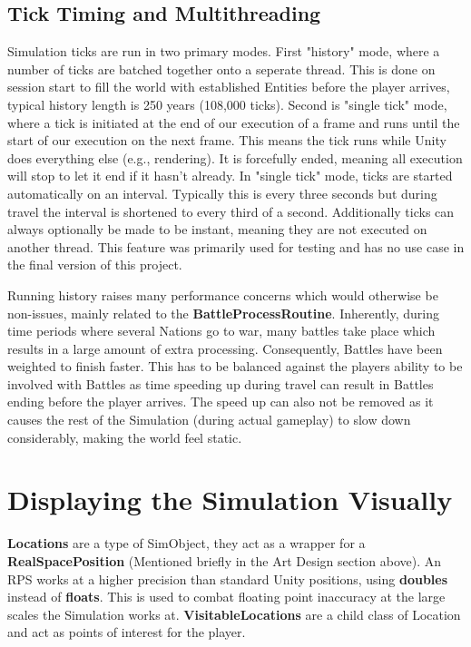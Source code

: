\documentclass{report}
\begin{document}
\subsection{Tick Timing and Multithreading}

Simulation ticks are run in two primary modes. First "history" mode, where a number of ticks are batched together onto a seperate thread. This is done on session start to fill the world with established Entities before the player arrives, typical history length is 250 years (108,000 ticks). 
Second is "single tick" mode, where a tick is initiated at the end of our execution of a frame and runs until the start of our execution on the next frame. This means the tick runs while Unity does everything else (e.g., rendering). It is forcefully ended, meaning all execution will stop to let it end if it hasn't already. In "single tick" mode, ticks are started automatically on an interval. Typically this is every three seconds but during travel the interval is shortened to every third of a second.
Additionally ticks can always optionally be made to be instant, meaning they are not executed on another thread. This feature was primarily used for testing and has no use case in the final version of this project.

Running history raises many performance concerns which would otherwise be non-issues, mainly related to the \textbf{BattleProcessRoutine}. Inherently, during time periods where several Nations go to war, many battles take place which results in a large amount of extra processing. Consequently, Battles have been weighted to finish faster. This has to be balanced against the players ability to be involved with Battles as time speeding up during travel can result in Battles ending before the player arrives. The speed up can also not be removed as it causes the rest of the Simulation (during actual gameplay) to slow down considerably, making the world feel static.

\section{Displaying the Simulation Visually}

\textbf{Locations} are a type of SimObject, they act as a wrapper for a \textbf{RealSpacePosition} (Mentioned briefly in the Art Design section above). An RPS works at a higher precision than standard Unity positions, using \textbf{doubles} instead of \textbf{floats}. This is used to combat floating point inaccuracy at the large scales the Simulation works at. \textbf{VisitableLocations} are a child class of Location and act as points of interest for the player.
\end{document}

